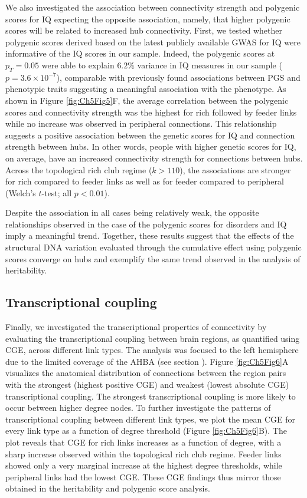 We also investigated the association between connectivity strength and polygenic scores for IQ expecting the opposite association, namely, that higher polygenic scores will be related to increased hub connectivity. First, we tested whether polygenic scores derived based on the latest publicly available GWAS for IQ \citep{Savage2018} were informative of the IQ scores in our sample. Indeed, the polygenic scores at $p_{T} = 0.05$ were able to explain $6.2\%$ variance in IQ measures in our sample ($p = 3.6 \times 10^{-7}$), comparable with previously found associations between PGS and phenotypic traits \citep{Euesden2015} suggesting a meaningful association with the phenotype. As shown in Figure \ref{fig:Ch5Fig5}F, the average correlation between the polygenic scores and connectivity strength was the highest for rich followed by feeder links while no increase was observed in peripheral connections. This relationship suggests a positive association between the genetic scores for IQ and connection strength between hubs. In other words, people with higher genetic scores for IQ, on average, have an increased connectivity strength for connections between hubs. Across the topological rich club regime ($k > 110$), the associations are stronger for rich compared to feeder links as well as for feeder compared to peripheral (Welch's $t$-test; all $p<0.01$).


Despite the association in all cases being relatively weak, the opposite relationships observed in the case of the polygenic scores for disorders and IQ imply a meaningful trend. Together, these results suggest that the effects of the structural DNA variation evaluated through the cumulative effect using polygenic scores converge on hubs and exemplify the same trend observed in the analysis of heritability.

\subsection{Transcriptional coupling}

Finally, we investigated the transcriptional properties of connectivity by evaluating the transcriptional coupling between brain regions, as quantified using CGE, across different link types. The analysis was focused to the left hemisphere due to the limited coverage of the AHBA (see section ). Figure \ref{fig:Ch5Fig6}A visualizes the anatomical distribution of connections between the region pairs with the strongest (highest positive CGE) and weakest (lowest absolute CGE) transcriptional coupling. The strongest transcriptional coupling is more likely to occur between higher degree nodes. To further investigate the patterns of transcriptional coupling between different link types, we plot the mean CGE for every link type as a function of degree threshold (Figure \ref{fig:Ch5Fig6}B). The plot reveals that CGE for rich links increases as a function of degree, with a sharp increase observed within the topological rich club regime. Feeder links showed only a very marginal increase at the highest degree thresholds, while peripheral links had the lowest CGE. These CGE findings thus mirror those obtained in the heritability and polygenic score analysis.

